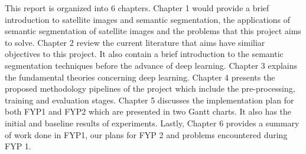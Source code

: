 This report is organized into 6 chapters. Chapter 1 would provide a brief introduction to satellite images and semantic segmentation, the applications of semantic segmentation of satellite images and the problems that this project aims to solve. Chapter 2 review the current literature that aims have similiar objectives to this project. It also contain a brief introduction to the semantic segmentation techniques before the advance of deep learning. Chapter 3 explains the fundamental theories concerning deep learning. Chapter 4 presents the proposed methodology pipelines of the project which include the pre-processing, training and evaluation stages. Chapter 5 discusses the implementation plan for both FYP1 and FYP2 which are presented in two Gantt charts. It also has the initial and baseline results of experiments. Lastly, Chapter 6 provides a summary of work
done in FYP1, our plans for FYP 2 and problems encountered during FYP 1.
